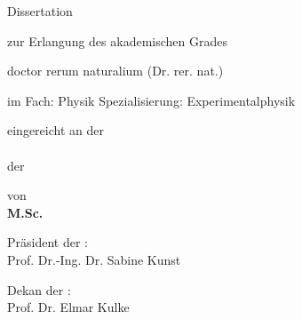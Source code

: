 \makeatletter
\begin{titlepage}
\begin{spacing}{1}
  \setlength{\parindentbak}{\parindent}
  \setlength{\parskipbak}{\parskip}

\setlength{\parindent}{0pt}
\setlength{\parskip}{\baselineskip}
\newcommand{\cbreak}{\vspace{0.6\baselineskip}}

\thispagestyle{empty}

\expandafter \Large\sffamily \expandafter

\begin{center}
\begin{spacing}{1.2}
\begingroup
\fontsize{18pt}{10pt}\selectfont
{\textbf{\mytitle}}
\endgroup
\end{spacing}

\cbreak

Dissertation

\cbreak

zur Erlangung des akademischen Grades

\cbreak

doctor rerum naturalium\linebreak
(Dr. rer. nat.)

\cbreak

im Fach: Physik\linebreak
Spezialisierung: Experimentalphysik

\cbreak

eingereicht an der \\ \myfaculty \\ der \myuni 

\cbreak

von\\
\textbf{M.Sc. \myname} %

\cbreak

Pr\"asident der \myuni: \\
\vspace{0.2\baselineskip}
Prof. Dr.-Ing. Dr. Sabine Kunst  \\

\vspace{0.5\baselineskip}

Dekan der \myfaculty: \\
\vspace{0.2\baselineskip}
Prof. Dr. Elmar Kulke  %


\end{center}
\end{spacing}
\end{titlepage}
